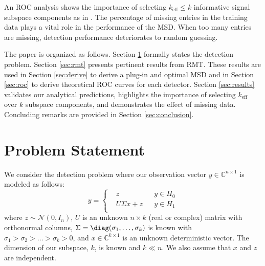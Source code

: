 An ROC analysis shows the importance of selecting $k_\text{eff}\leq k$ informative signal subspace components as in \cite{asendorf2011msd}. The percentage of missing entries in the training data plays a vital role in the performance of the MSD. When too many entries are missing, detection performance deteriorates to random guessing.

The paper is organized as follows. Section \ref{sec:prob stat} formally states the detection problem. Section \ref{sec:rmt} presents pertinent results from RMT. These results are used in Section \ref{sec:derive} to derive a plug-in and optimal MSD and in Section \ref{sec:roc} to derive theoretical ROC curves for each detector. Section \ref{sec:results} validates our analytical predictions, highlights the importance of selecting $k_\text{eff}$ over $k$ subspace components, and demonstrates the effect of missing data. Concluding remarks are provided in Section \ref{sec:conclusion}.

\section{Problem Statement}\label{sec:prob stat}

We consider the detection problem where our observation vector $y \in \mathbb{C}^{n \times 1}$ is modeled as follows:
\begin{equation}
y=\left\{
\begin{aligned}
&z
&& y\in H_0\\
&U\Sigma x+z
&& y\in H_1\\
\end{aligned}\right.
\end{equation}
where $z\sim\mathcal{N}(0,I_n)$, $U$ is an unknown $n\times k$ (real or complex) matrix with orthonormal columns, $\Sigma=\diag(\sigma_1,\dots,\sigma_k)$ is known with $\sigma_1>\sigma_2>\dots>\sigma_k>0$, and $x\in\mathbb{C}^{k\times 1}$ is an unknown deterministic vector. The dimension of our subspace, $k$, is known and $k\ll n$. We also assume that $x$ and $z$ are independent.

